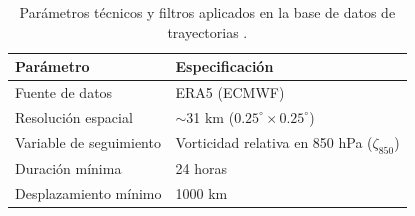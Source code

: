 \begin{table}[ht]
\centering
\caption[Parámetros y filtros de la base de trayectorias]{Parámetros técnicos y filtros aplicados en la base de datos de trayectorias \citep{gramcianinov2020analysis}.}
\label{tab:tracking_params}
\begin{tabular*}{\textwidth}{@{\extracolsep{\fill}}ll}
\hline
Parámetro & Especificación \\ 
\hline
Fuente de datos & ERA5 (ECMWF) \\
Resolución espacial & $\sim$31 km ($0.25^\circ \times 0.25^\circ$) \\
Variable de seguimiento & Vorticidad relativa en 850 hPa ($\zeta_{850}$) \\
Duración mínima & 24 horas \\
Desplazamiento mínimo & 1000 km \\ 
\hline
\end{tabular*}
\end{table}

